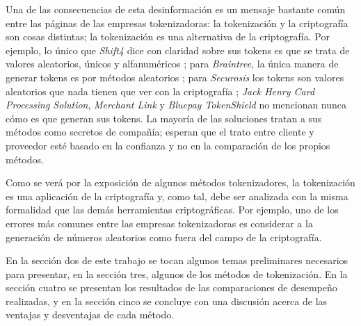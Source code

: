 Una de las consecuencias de esta desinformación es un mensaje bastante común
entre las páginas de las empresas tokenizadoras: la tokenización y la
criptografía son cosas distintas; la tokenización es una alternativa de la
criptografía. Por ejemplo, lo único que \textit{Shift4} dice con claridad sobre
sus tokens es que se trata de valores aleatorios, únicos y alfanuméricos
\cite{shif4_uno} \cite{shif4_dos}; para \textit{Braintree}, la única manera de
generar tokens es por métodos aleatorios \cite{braintree_uno}; para
\textit{Securosis} los tokens son valores aleatorios que nada tienen que ver con
la criptografía \cite{securosis}; \textit{Jack Henry Card Processing Solution},
\textit{Merchant Link} y \textit{Bluepay TokenShield} no mencionan nunca cómo es
que generan sus tokens. La mayoría de las soluciones tratan a sus métodos como
secretos de compañía; esperan que el trato entre cliente y proveedor esté basado
en la confianza y no en la comparación de los propios métodos.


Como se verá por la exposición de algunos métodos tokenizadores, la tokenización
es una aplicación de la criptografía y, como tal, debe ser analizada con la
misma formalidad que las demás herramientas criptográficas. Por ejemplo, uno de
los errores más comunes entre las empresas tokenizadoras es considerar a la
generación de números aleatorios como fuera del campo de la criptografía.


En la sección dos de este trabajo se tocan algunos temas preliminares necesarios
para presentar, en la sección tres, algunos de los métodos de tokenización. En la
sección cuatro se presentan los resultados de las comparaciones de desempeño
realizadas, y en la sección cinco se concluye con una discusión acerca de las
ventajas y desventajas de cada método.
